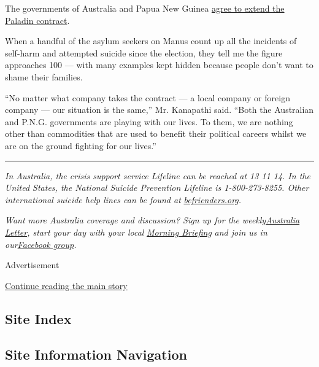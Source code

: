The governments of Australia and Papua New Guinea
\href{https://www.abc.net.au/news/2019-06-26/australia-and-png-agree-to-limited-extension-manus-contracts/11249702}{agree
to extend the Paladin contract}.

When a handful of the asylum seekers on Manus count up all the incidents
of self-harm and attempted suicide since the election, they tell me the
figure approaches 100 --- with many examples kept hidden because people
don't want to shame their families.

``No matter what company takes the contract --- a local company or
foreign company --- our situation is the same,'' Mr. Kanapathi said.
``Both the Australian and P.N.G. governments are playing with our lives.
To them, we are nothing other than commodities that are used to benefit
their political careers whilst we are on the ground fighting for our
lives.''

\begin{center}\rule{0.5\linewidth}{\linethickness}\end{center}

\emph{In Australia, the crisis support service Lifeline can be reached
at 13 11 14. In the United States, the National Suicide Prevention
Lifeline is 1-800-273-8255. Other international suicide help lines can
be found at}
\href{https://www.befrienders.org/}{\emph{befrienders.org}}\emph{.}

\emph{Want more Australia coverage and discussion? Sign up for the
weekly}\href{https://www.nytimes.com/newsletters/australia-letter?utm_source=ausend}{\emph{Australia
Letter}}\emph{, start your day with your local}
\href{https://www.nytimes.com/interactive/2018/briefing/global-morning-briefing-newsletter-signup.html?utm_source=ausend}{\emph{Morning
Briefing}} \emph{and join us in
our}\href{https://www.facebook.com/groups/nytaustralia/}{\emph{Facebook
group}}\emph{.}

Advertisement

\protect\hyperlink{after-bottom}{Continue reading the main story}

\hypertarget{site-index}{%
\subsection{Site Index}\label{site-index}}

\hypertarget{site-information-navigation}{%
\subsection{Site Information
Navigation}\label{site-information-navigation}}

